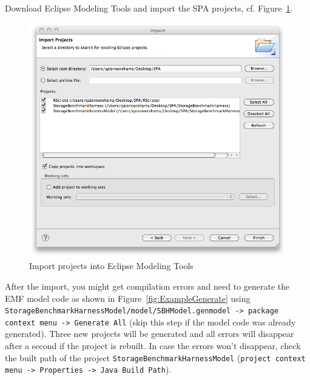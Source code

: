 Download Eclipse Modeling Tools and import the SPA projects, cf. Figure~\ref{fig:ExampleImport}.

\begin{figure}[htbp]
	\centering
	\includegraphics[scale=0.375]{graphics/example/Import.png}
	\caption{Import projects into Eclipse Modeling Tools}
 	\label{fig:ExampleImport}
 	\vspace{-8pt}
\end{figure}

After the import, you might get compilation errors and need to generate the EMF model code as shown in Figure~\ref{fig:ExampleGenerate} using \texttt{StorageBenchmarkHarnessModel/model/SBHModel.genmodel -> package context menu -> Generate All} (skip this step if the model code was already generated). Three new projects will be generated and all errors will disappear after a second if the project is rebuilt. In case the errors won't disappear, check the built path of the project \texttt{StorageBenchmarkHarnessModel} (\texttt{project context menu -> Properties -> Java Build Path}).

